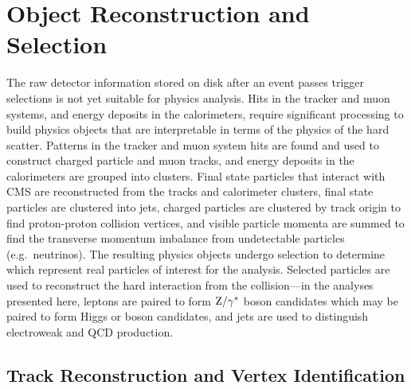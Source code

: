 
\chapter{Object Reconstruction and Selection}

The raw detector information stored on disk after an event passes trigger selections is not yet suitable for physics analysis.
Hits in the tracker and muon systems, and energy deposits in the calorimeters, require significant processing to build physics objects that are interpretable in terms of the physics of the hard scatter.
Patterns in the tracker and muon system hits are found and used to construct charged particle and muon tracks, and energy deposits in the calorimeters are grouped into clusters.
Final state particles that interact with CMS are reconstructed from the tracks and calorimeter clusters, final state particles are clustered into jets, charged particles are clustered by track origin to find proton-proton collision vertices, and visible particle momenta are summed to find the transverse momentum imbalance from undetectable particles (e.g.\ neutrinos).
The resulting physics objects undergo selection to determine which represent real particles of interest for the analysis.
Selected particles are used to reconstruct the hard interaction from the collision---in the analyses presented here, leptons are paired to form $\mathrm{Z}/\mathrm{\gamma}^\ast$ boson candidates which may be paired to form Higgs or {\PZ} boson candidates, and jets are used to distinguish electroweak and QCD {\ZZ} production.


\section{Track Reconstruction and Vertex Identification}\label{sec:trkVtxReco}

